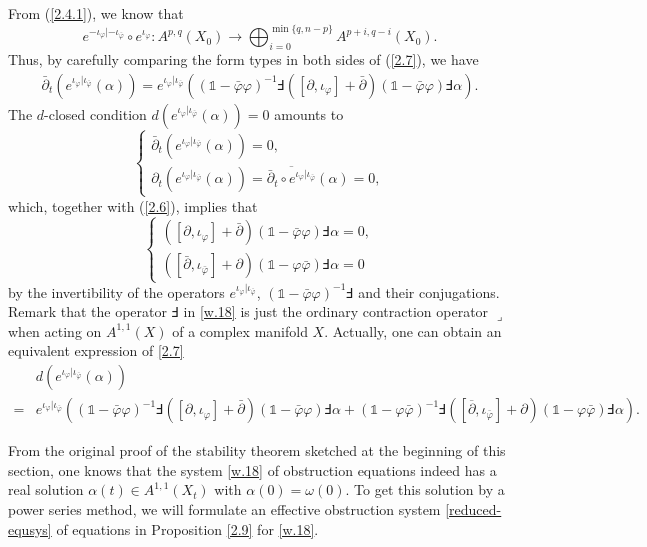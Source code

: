 \documentclass[12pt]{amsart}
\numberwithin{equation}{section}
\renewcommand{\1}{\mathds{1}}
\newcommand{\db}{\overline{\partial}}
\newcommand{\lc}{\lrcorner}
\renewcommand{\>}{\rightarrow}
\newcommand{\p}{\partial}
\def\p{\partial}
\def\o{\overline}
\def\b{\bar}
\begin{document}
From (\ref{2.4.1}), we know that
$$
  e^{-\iota_{\varphi}|-\iota_{\b{\varphi}}}\circ e^{\iota_{\varphi}}: A^{p,q}(X_0)\to \bigoplus_{i=0}^{\min\{q,n-p\}}A^{p+i,q-i}(X_0).
$$
Thus, by carefully comparing the form types in both sides  of
(\ref{2.7}), we have
 \begin{align}\label{2.6}
   \b{\p}_t(e^{\iota_{\varphi}|\iota_{\b{\varphi}}}(\alpha))=e^{\iota_{\varphi}|\iota_{\b{\varphi}}}\left((\1-\b{\varphi}\varphi)^{-1}\Finv([\p,\iota_{\varphi}]+\b{\p})(\1-\b{\varphi}\varphi)\Finv\alpha\right).
 \end{align}
The $d$-closed condition
$d(e^{\iota_{\varphi}|\iota_{\b{\varphi}}}(\alpha))=0$ amounts to
$$\begin{cases}
\b{\p}_t(e^{\iota_{\varphi}|\iota_{\b{\varphi}}}(\alpha))=0,\\
 \p_t(e^{\iota_{\varphi}|\iota_{\b{\varphi}}}(\alpha))=\o{\b{\p}_t\circ e^{\iota_{\varphi}|\iota_{\b{\varphi}}}}({\alpha})=0,
    \end{cases}
$$
which, together with (\ref{2.6}), implies that
 \begin{equation}\label{w.18}
    \begin{cases}
      ([\p,\iota_{\varphi}]+\b{\p})(\1-\b{\varphi}\varphi)\Finv\alpha=0,\\
      ([\b{\p},\iota_{\b{\varphi}}]+\p)(\1-\varphi\b{\varphi})\Finv\alpha=0
    \end{cases}
 \end{equation}
by the invertibility of the operators
$e^{\iota_{\varphi}|\iota_{\b{\varphi}}}$,
$(\1-\b{\varphi}\varphi)^{-1}\Finv$ and their conjugations. Remark
that the operator $\Finv$ in \eqref{w.18} is just the ordinary
contraction operator $\lc$ when acting on $A^{1,1}(X)$ of a complex
manifold $X$. Actually, one can obtain an equivalent expression of
\eqref{2.7}
 \begin{align*}
    &d(e^{\iota_{\varphi}|\iota_{\b{\varphi}}}(\alpha))\\=&
    e^{\iota_{\varphi}|\iota_{\b{\varphi}}}\left((\1-\b{\varphi}\varphi)^{-1}\Finv([\p,\iota_{\varphi}]+\b{\p})(\1-\b{\varphi}\varphi)\Finv\alpha
    +(\1-\varphi\b{\varphi})^{-1}\Finv([\db,\iota_{\b\varphi}]+{\p})(\1-\varphi\b{\varphi})\Finv\alpha\right).
 \end{align*}

From the original proof of the stability theorem sketched at the
beginning of this section, one knows that the system \eqref{w.18} of
obstruction equations indeed has a real solution $\alpha(t)\in
A^{1,1}(X_t)$ with $\alpha(0)=\omega(0)$. To get this solution by a
power series method, we will formulate an effective obstruction
system \eqref{reduced-equsys} of equations in Proposition \ref{2.9}
for \eqref{w.18}.
\end{document}
